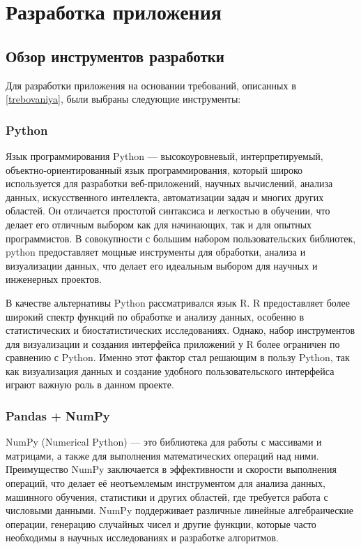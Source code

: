 
\section{Разработка приложения}

\subsection{Обзор инструментов разработки}

Для разработки приложения на основании требований, описанных в \ref{trebovaniya}, были выбраны следующие инструменты:

\subsubsection{Python}

Язык программирования Python --- высокоуровневый, интерпретируемый, объектно-ориентированный язык программирования, который широко используется для разработки веб-приложений, научных вычислений, анализа данных, искусственного интеллекта, автоматизации задач и многих других областей. Он отличается простотой синтаксиса и легкостью в обучении, что делает его отличным выбором как для начинающих, так и для опытных программистов. В совокупности с большим набором пользовательских библиотек, python предоставляет мощные инструменты для обработки, анализа и визуализации данных, что делает его идеальным выбором для научных и инженерных проектов. 

В качестве альтернативы Python рассматривался язык R. R предоставляет более широкий спектр функций по обработке и анализу данных, особенно в статистических и биостатистических исследованиях. Однако, набор инструментов для визуализации и создания интерфейса приложений у R более ограничен по сравнению с Python. Именно этот фактор стал решающим в пользу Python, так как визуализация данных и создание удобного пользовательского интерфейса играют важную роль в данном проекте.

\subsubsection{Pandas + NumPy}

NumPy (Numerical Python) --- это библиотека для работы с массивами и матрицами, а также для выполнения математических операций над ними. Преимущество NumPy заключается в эффективности и скорости выполнения операций, что делает её неотъемлемым инструментом для анализа данных, машинного обучения, статистики и других областей, где требуется работа с числовыми данными. NumPy поддерживает различные линейные алгебраические операции, генерацию случайных чисел и другие функции, которые часто необходимы в научных исследованиях и разработке алгоритмов.

